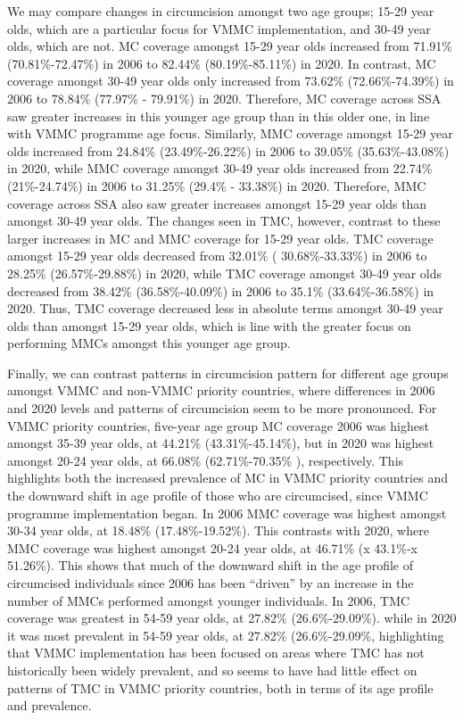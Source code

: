 \documentclass{article}
\begin{document}
We may compare changes in circumcision amongst two age groups; 15-29 year olds, which are a particular focus for VMMC implementation, and 30-49 year olds, which are not. MC coverage amongst 15-29 year olds increased from 71.91\% (70.81\%-72.47\%) in 2006 to 82.44\% (80.19\%-85.11\%) in 2020. In contrast, MC
coverage amongst 30-49 year olds only increased from 73.62\% (72.66\%-74.39\%) in 2006 to 78.84\% (77.97\%
- 79.91\%) in 2020. Therefore, MC coverage across SSA saw greater increases in this younger age group
than in this older one, in line with VMMC programme age focus. Similarly, MMC coverage amongst 15-29
year olds increased from 24.84\% (23.49\%-26.22\%) in 2006 to 39.05\% (35.63\%-43.08\%) in 2020, while
MMC coverage amongst 30-49 year olds increased from 22.74\% (21\%-24.74\%) in 2006 to 31.25\% (29.4\% -
33.38\%) in 2020. Therefore, MMC coverage across SSA also saw greater increases amongst 15-29 year olds
than amongst 30-49 year olds. The changes seen in TMC, however, contrast to these larger increases in MC
and MMC coverage for 15-29 year olds. TMC coverage amongst 15-29 year olds decreased from 32.01\% (
30.68\%-33.33\%) in 2006 to 28.25\% (26.57\%-29.88\%) in 2020, while TMC coverage amongst 30-49 year
olds decreased from 38.42\% (36.58\%-40.09\%) in 2006 to 35.1\% (33.64\%-36.58\%) in 2020. Thus, TMC
coverage decreased less in absolute terms amongst 30-49 year olds than amongst 15-29 year olds, which is line
with the greater focus on performing MMCs amongst this younger age group.

Finally, we can contrast patterns in circumcision pattern for different age groups amongst VMMC and
non-VMMC priority countries, where differences in 2006 and 2020 levels and patterns of circumcision seem to
be more pronounced.
For VMMC priority countries, five-year age group MC coverage 2006 was highest amongst 35-39 year olds, at
44.21\% (43.31\%-45.14\%), but in 2020 was highest amongst 20-24 year olds, at 66.08\% (62.71\%-70.35\%
), respectively. This highlights both the increased prevalence of MC in VMMC priority countries and the
downward shift in age profile of those who are circumcised, since VMMC programme implementation began.
In 2006 MMC coverage was highest amongst 30-34 year olds, at 18.48\% (17.48\%-19.52\%). This contrasts
with 2020, where MMC coverage was highest amongst 20-24 year olds, at 46.71\% (x 43.1\%-x 51.26\%).
This shows that much of the downward shift in the age profile of circumcised individuals since 2006 has been
“driven” by an increase in the number of MMCs performed amongst younger individuals. In 2006, TMC
coverage was greatest in 54-59 year olds, at 27.82\% (26.6\%-29.09\%). while in 2020 it was most prevalent
in 54-59 year olds, at 27.82\% (26.6\%-29.09\%, highlighting that VMMC implementation has been focused on areas where TMC has not historically been widely prevalent, and so seems to have had little effect on patterns of TMC in VMMC priority countries, both in terms of its age profile and prevalence.
\end{document}
